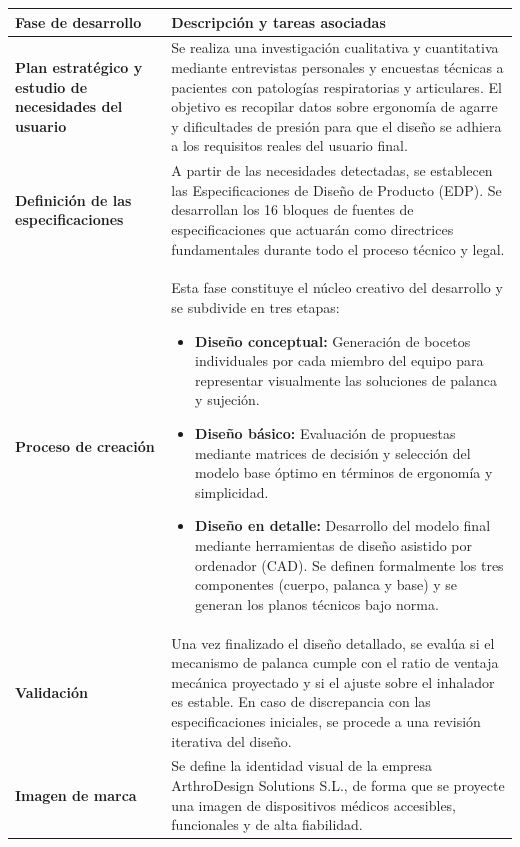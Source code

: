 \documentclass[11pt,a4paper]{article}
\begin{document}
\begin{table}[H]
\centering\small
\begin{tabular}{|p{4.2cm}|p{9.8cm}|}
\hline
\rowcolor{ArthroNavy}
\textbf{\color{white}Fase de desarrollo} & \textbf{\color{white}Descripción y tareas asociadas} \\
\hline
\textbf{Plan estratégico y estudio de necesidades del usuario} & Se realiza una investigación cualitativa y cuantitativa mediante entrevistas personales y encuestas técnicas a pacientes con patologías respiratorias y articulares. El objetivo es recopilar datos sobre ergonomía de agarre y dificultades de presión para que el diseño se adhiera a los requisitos reales del usuario final. \\
\hline
\textbf{Definición de las especificaciones} & A partir de las necesidades detectadas, se establecen las Especificaciones de Diseño de Producto (EDP). Se desarrollan los 16 bloques de fuentes de especificaciones que actuarán como directrices fundamentales durante todo el proceso técnico y legal. \\
\hline
\textbf{Proceso de creación} & Esta fase constituye el núcleo creativo del desarrollo y se subdivide en tres etapas:
\begin{itemize}[leftmargin=*, topsep=0pt, itemsep=0.2em]
    \item \textbf{Diseño conceptual:} Generación de bocetos individuales por cada miembro del equipo para representar visualmente las soluciones de palanca y sujeción.
    \item \textbf{Diseño básico:} Evaluación de propuestas mediante matrices de decisión y selección del modelo base óptimo en términos de ergonomía y simplicidad.
    \item \textbf{Diseño en detalle:} Desarrollo del modelo final mediante herramientas de diseño asistido por ordenador (CAD). Se definen formalmente los tres componentes (cuerpo, palanca y base) y se generan los planos técnicos bajo norma.
\end{itemize} \\
\hline
\textbf{Validación} & Una vez finalizado el diseño detallado, se evalúa si el mecanismo de palanca cumple con el ratio de ventaja mecánica proyectado y si el ajuste sobre el inhalador es estable. En caso de discrepancia con las especificaciones iniciales, se procede a una revisión iterativa del diseño. \\
\hline
\textbf{Imagen de marca} & Se define la identidad visual de la empresa ArthroDesign Solutions S.L., de forma que se proyecte una imagen de dispositivos médicos accesibles, funcionales y de alta fiabilidad. \\

\end{tabular}
\end{table}
\end{document}
